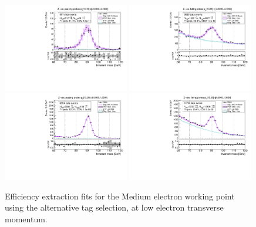 \begin{figure}
\centering
\includegraphics[width=0.49\textwidth]{figures/Zee_AltTag_pass_ptBin0_etaBin0.pdf}
\includegraphics[width=0.49\textwidth]{figures/Zee_AltTag_fail_ptBin0_etaBin0.pdf}
\includegraphics[width=0.49\textwidth]{figures/Zee_AltTag_pass_ptBin1_etaBin19.pdf}
\includegraphics[width=0.49\textwidth]{figures/Zee_AltTag_fail_ptBin1_etaBin19.pdf}
\caption{Efficiency extraction fits for the Medium electron working point using the alternative tag selection, at low electron transverse momentum.}
\label{fig:ZeeAltAltTagFits1}
\end{figure}


